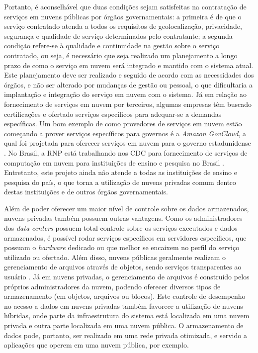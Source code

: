 Portanto, é aconselhável que duas condições sejam satisfeitas na contratação de serviços em nuvens públicas por órgãos governamentais: a primeira é de que o serviço contratado atenda a todos os requisitos de geolocalização, privacidade, segurança e qualidade de serviço determinados pelo contratante; a segunda condição refere-se à qualidade e continuidade na gestão sobre o serviço contratado, ou seja, é necessário que seja realizado um planejamento a longo prazo de como o serviço em nuvem será integrado e mantido com o sistema atual. Este planejamento deve ser realizado e seguido de acordo com as necessidades dos órgãos, e não ser alterado por mudanças de gestão ou pessoal, o que dificultaria a implantação e integração do serviço em nuvem com o sistema. Já em relação ao fornecimento de serviços em nuvem por terceiros, algumas empresas têm buscado certificações e ofertado serviços específicos para adequar-se a demandas específicas. Um bom exemplo de como provedores de serviços em nuvem estão começando a prover serviços específicos para governos é a \textit{Amazon GovCloud}, a qual foi projetada para oferecer serviços em nuvem para o governo estadunidense \cite{govcloud}.  No Brasil, a \ac{RNP} está trabalhando nos \ac{CDC} para fornecimento de serviços de computação em nuvem para instituições de ensino e pesquisa no Brasil \cite{cdcRNP}. Entretanto, este projeto ainda não atende a todas as instituições de ensino e pesquisa do país, o que torna a utilização de nuvens privadas comum dentro destas instituições e de outros órgãos governamentais.

Além de poder oferecer um maior nível de controle sobre os dados armazenados, nuvens privadas também possuem outras vantagens. Como os administradores dos \textit{data centers} possuem total controle sobre os serviços executados e dados armazenados, é possível rodar serviços específicos em servidores específicos, que possuam o \textit{hardware} dedicado ou que melhor se encaixem no perfil do serviço utilizado ou ofertado. Além disso, nuvens públicas geralmente realizam o gerenciamento de arquivos através de objetos, sendo serviços transparentes ao usuário \cite{azureobject} \cite{amazonobject}. Já em nuvens privadas, o gerenciamento de arquivos é construído pelos próprios administradores da nuvem, podendo oferecer diversos tipos de armazenamento (em objetos, arquivos ou blocos). Este controle de desempenho no acesso a dados em nuvens privadas também favorece a utilização de nuvens híbridas, onde parte da infraestrutura do sistema está localizada em uma nuvem privada e outra parte localizada em uma nuvem pública. O armazenamento de dados pode, portanto, ser realizado em uma rede privada otimizada, e servido a aplicações que operem em uma nuvem pública, por exemplo.

